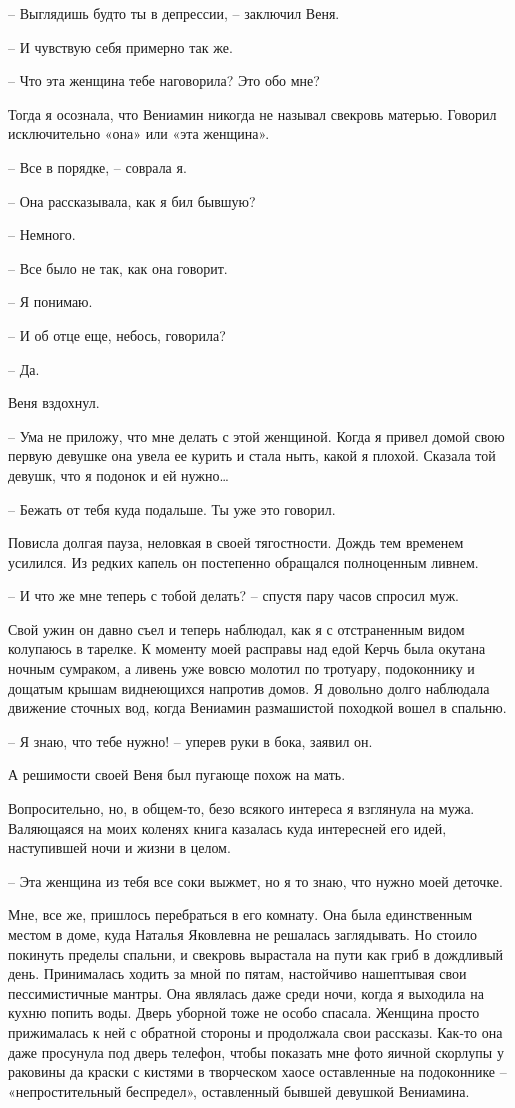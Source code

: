 \documentclass[
]{book}
\begin{document}
-- Выглядишь будто ты в депрессии, -- заключил Веня.

-- И чувствую себя примерно так же.

-- Что эта женщина тебе наговорила? Это обо мне?

Тогда я осознала, что Вениамин никогда не называл свекровь матерью. Говорил исключительно «она» или «эта женщина».

-- Все в порядке, -- соврала я.

-- Она рассказывала, как я бил бывшую?

-- Немного.

-- Все было не так, как она говорит.

-- Я понимаю.

-- И об отце еще, небось, говорила?

-- Да.

Веня вздохнул.

-- Ума не приложу, что мне делать с этой женщиной. Когда я привел домой свою первую девушке она увела ее курить и стала ныть, какой я плохой. Сказала той девушк, что я подонок и ей нужно\ldots{}

-- Бежать от тебя куда подальше. Ты уже это говорил.

Повисла долгая пауза, неловкая в своей тягостности. Дождь тем временем усилился. Из редких капель он постепенно обращался полноценным ливнем.

-- И что же мне теперь с тобой делать? -- спустя пару часов спросил муж.

Свой ужин он давно съел и теперь наблюдал, как я с отстраненным видом колупаюсь в тарелке. К моменту моей расправы над едой Керчь была окутана ночным сумраком, а ливень уже вовсю молотил по тротуару, подоконнику и дощатым крышам виднеющихся напротив домов. Я довольно долго наблюдала движение сточных вод, когда Вениамин размашистой походкой вошел в спальню.

-- Я знаю, что тебе нужно! -- уперев руки в бока, заявил он.

А решимости своей Веня был пугающе похож на мать.

Вопросительно, но, в общем-то, безо всякого интереса я взглянула на мужа. Валяющаяся на моих коленях книга казалась куда интересней его идей, наступившей ночи и жизни в целом.

-- Эта женщина из тебя все соки выжмет, но я то знаю, что нужно моей деточке.

Мне, все же, пришлось перебраться в его комнату. Она была единственным местом в доме, куда Наталья Яковлевна не решалась заглядывать. Но стоило покинуть пределы спальни, и свекровь вырастала на пути как гриб в дождливый день. Принималась ходить за мной по пятам, настойчиво нашептывая свои пессимистичные мантры. Она являлась даже среди ночи, когда я выходила на кухню попить воды. Дверь уборной тоже не особо спасала. Женщина просто прижималась к ней с обратной стороны и продолжала свои рассказы. Как-то она даже просунула под дверь телефон, чтобы показать мне фото яичной скорлупы у раковины да краски с кистями в творческом хаосе оставленные на подоконнике -- «непростительный беспредел», оставленный бывшей девушкой Вениамина.
\end{document}

